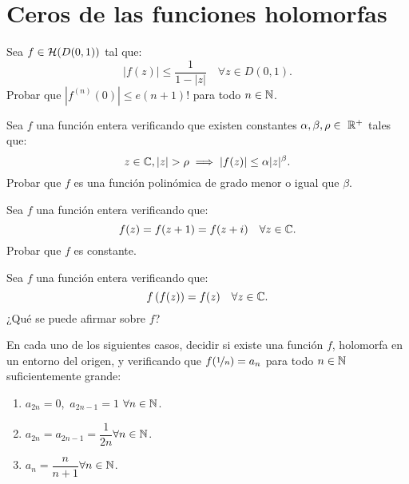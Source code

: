 \section{Ceros de las funciones holomorfas}

\begin{ejercicio}
    Sea $f\in \mathcal{H}(D(0,1))$ tal que:
    \begin{equation*}
        |f(z)|\leq \frac{1}{1-|z|} \quad \forall z\in D(0,1).
    \end{equation*}
    Probar que $|f^{(n)}(0)|\leq e(n+1)!$ para todo $n\in \mathbb{N}$.
\end{ejercicio}

\begin{ejercicio}
    Sea $f$ una función entera verificando que existen constantes $\alpha,\beta,\rho\in~\mathbb{R}^+$ tales que:
    \begin{equation*}
        z\in \bb{C}, |z|>\rho \implies |f(z)|\leq \alpha |z|^\beta.
    \end{equation*}
    Probar que $f$ es una función polinómica de grado menor o igual que $\beta$.
\end{ejercicio}

\begin{ejercicio}
    Sea $f$ una función entera verificando que:
    \begin{equation*}
        f(z)=f(z+1)=f(z+i) \quad \forall z\in \mathbb{C}.
    \end{equation*}
    Probar que $f$ es constante.
\end{ejercicio}


\begin{ejercicio}
    Sea $f$ una función entera verificando que:
    \begin{equation*}
        f\left(f(z)\right)=f(z) \quad \forall z\in \mathbb{C}.
    \end{equation*}
    ¿Qué se puede afirmar sobre $f$?
\end{ejercicio}

\begin{ejercicio}
    En cada uno de los siguientes casos, decidir si existe una función $f$, holomorfa en un entorno del origen, y verificando que $f(\nicefrac{1}{n})=a_n$ para todo $n\in \mathbb{N}$ suficientemente grande:
    \begin{enumerate}
        \item $a_{2n}=0$,\ $a_{2n-1}=1$ \qquad$\forall n\in \mathbb{N}$.
        \item $a_{2n}=a_{2n-1}=\dfrac{1}{2n}$\qquad $\forall n\in \mathbb{N}$.
        \item $a_n=\dfrac{n}{n+1}$\qquad $\forall n\in \mathbb{N}$.
    \end{enumerate}
\end{ejercicio}

